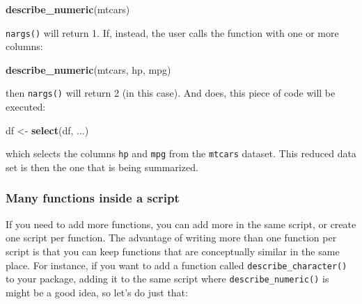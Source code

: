 \documentclass[
]{article}
\newenvironment{Shaded}{\begin{snugshade}}{\end{snugshade}}
\newcommand{\KeywordTok}[1]{\textcolor[rgb]{0.13,0.29,0.53}{\textbf{#1}}}
\newcommand{\NormalTok}[1]{#1}
\newcommand{\StringTok}[1]{\textcolor[rgb]{0.31,0.60,0.02}{#1}}
\begin{document}
\begin{Shaded}
\begin{Highlighting}[]
\KeywordTok{describe\_numeric}\NormalTok{(mtcars)}
\end{Highlighting}
\end{Shaded}

\texttt{nargs()} will return 1. If, instead, the user calls the function with one or more columns:

\begin{Shaded}
\begin{Highlighting}[]
\KeywordTok{describe\_numeric}\NormalTok{(mtcars, hp, mpg)}
\end{Highlighting}
\end{Shaded}

then \texttt{nargs()} will return 2 (in this case). And does, this piece of code will be executed:

\begin{Shaded}
\begin{Highlighting}[]
\NormalTok{df \textless{}{-}}\StringTok{ }\KeywordTok{select}\NormalTok{(df, ...)}
\end{Highlighting}
\end{Shaded}

which selects the columns \texttt{hp} and \texttt{mpg} from the \texttt{mtcars} dataset. This reduced data set is then
the one that is being summarized.

\hypertarget{many-functions-inside-a-script}{%
\subsubsection{Many functions inside a script}\label{many-functions-inside-a-script}}

If you need to add more functions, you can add more in the same
script, or create one script per function. The advantage of writing more than one function per
script is that you can keep functions that are conceptually similar in the same place. For instance,
if you want to add a function called \texttt{describe\_character()} to your package, adding it to the same
script where \texttt{describe\_numeric()} is might be a good idea, so let's do just that:
\end{document}
